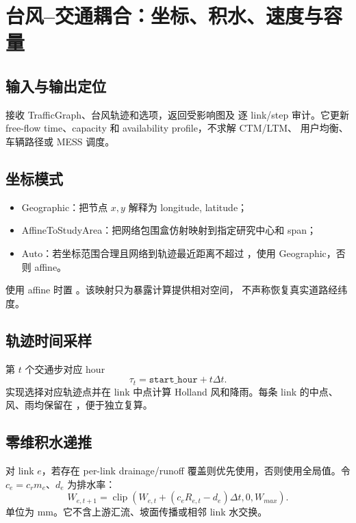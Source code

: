 \section{台风--交通耦合：坐标、积水、速度与容量}
\label{sec:traffic-coupling}

\subsection{输入与输出定位}
 接收 TrafficGraph、台风轨迹和选项，返回受影响图及
逐 link/step 审计。它更新 free-flow time、capacity 和 availability profile，不求解 CTM/LTM、
用户均衡、车辆路径或 MESS 调度。

\subsection{坐标模式}
\begin{itemize}
  \item Geographic：把节点 $x,y$ 解释为 longitude, latitude；
  \item AffineToStudyArea：把网络包围盒仿射映射到指定研究中心和 span；
  \item Auto：若坐标范围合理且网络到轨迹最近距离不超过
        ，使用 Geographic，否则 affine。
\end{itemize}
使用 affine 时置 。该映射只为暴露计算提供相对空间，
不声称恢复真实道路经纬度。

\subsection{轨迹时间采样}
第 $t$ 个交通步对应 hour
\begin{equation}
 \tau_t=\texttt{start\_hour}+t\Delta t.
\end{equation}
实现选择对应轨迹点并在 link 中点计算 Holland 风和降雨。每条 link 的中点、风、雨均保留在
，便于独立复算。

\subsection{零维积水递推}
对 link $e$，若存在 per-link drainage/runoff 覆盖则优先使用，否则使用全局值。令
$c_e=c_r m_e$、$d_e$ 为排水率：
\begin{equation}
 W_{e,t+1}=\operatorname{clip}\left(
 W_{e,t}+(c_eR_{e,t}-d_e)\Delta t,0,W_{max}\right).
\end{equation}
单位为 mm。它不含上游汇流、坡面传播或相邻 link 水交换。


